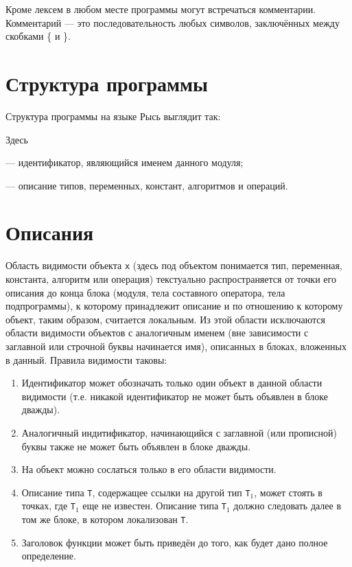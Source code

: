 \documentclass[10pt]{report}
\begin{document}
Кроме лексем в любом месте программы могут встречаться комментарии. Комментарий --- это последовательность любых символов, заключённых между скобками \{ и \}. 


    \section{Структура программы}
Структура программы на языке Рысь выглядит так:


Здесь

\noindent\textcolor{Green}{} --- идентификатор, являющийся именем данного модуля;

\noindent\textcolor{Green}{} --- описание типов, переменных, констант, алгоритмов и операций.


    \section{Описания}

Область видимости объекта \texttt{x} (здесь под объектом понимается тип, переменная, константа, алгоритм или операция) текстуально распространяется от точки его описания до
конца блока (модуля, тела составного оператора, тела подпрограммы), к которому принадлежит описание и по отношению к которому объект, таким образом, считается локальным. Из
этой области исключаются области видимости объектов с аналогичным именем (вне зависимости с заглавной или строчной буквы начинается имя), описанных в блоках, вложенных в данный. Правила видимости таковы:
\begin{enumerate}
    \item Идентификатор может обозначать только один объект в данной области видимости (т.е. никакой идентификатор не может быть объявлен в блоке дважды).
    \item Аналогичный индитификатор, начинающийся с заглавной (или прописной) буквы также не может быть объявлен в блоке дважды.
    \item На объект можно сослаться только в его области видимости.
    \item Описание типа \texttt{T}, содержащее ссылки на другой тип \texttt{T}$_1$, может стоять в точках, где \texttt{T}$_1$ еще не известен. Описание типа \texttt{T}$_1$
должно следовать далее в том же блоке, в котором локализован \texttt{T}.
    \item Заголовок функции может быть приведён до того, как будет дано полное определение.
\end{enumerate}
\end{document}
